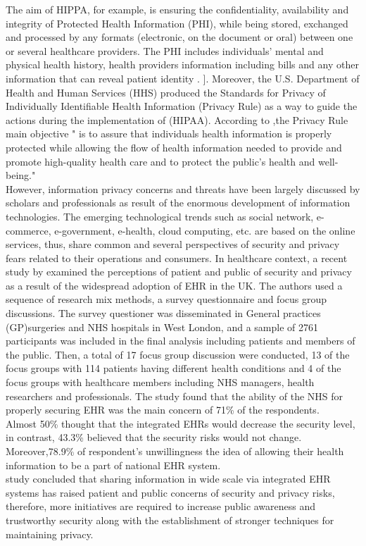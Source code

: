 The aim of HIPPA, for example, is ensuring the confidentiality, availability and integrity of Protected Health Information (PHI), while being stored, exchanged and processed by any formats (electronic, on the document or oral) between one or several healthcare providers. The PHI includes individuals’ mental and physical health history, health providers information including bills and any other information that can reveal patient identity  \cite{U.S.DepartmentofHealthandHumanServices,Rahim2016,Andriole2014a}.
]. Moreover, the U.S. Department of Health and Human Services (HHS) produced the Standards for Privacy of Individually Identifiable Health Information (Privacy Rule) as a way to guide the actions during the implementation of (HIPAA). According to  \cite{U.S.DepartmentofHealthandHumanServices},the Privacy Rule main objective " is to assure that individuals health information is properly protected while allowing the flow of health information needed to provide and promote high-quality health care and to protect the public's health and well-being."
\\
However, information privacy concerns and threats have been largely discussed by scholars and professionals as result of the enormous development of information technologies. The emerging technological trends such as social network, e-commerce, e-government, e-health, cloud computing, etc. are based on the online services, thus, share common and several perspectives of security and privacy fears related to their operations and consumers. In healthcare context, a recent study by  \citet{Papoutsi2015} examined the perceptions of patient and public of security and privacy as a result of the widespread adoption of EHR in the UK. The authors used a sequence of research mix methods, a survey questionnaire and focus group discussions. The survey questioner was disseminated in General practices (GP)surgeries and NHS hospitals in West London, and a sample of 2761 participants was included in the final analysis including patients and members of the public. Then, a total of 17 focus group discussion were conducted, 13 of the focus groups with 114 patients having different health conditions and 4 of the focus groups with healthcare members including NHS managers, health researchers and professionals. The study found that the ability of the NHS for properly securing EHR was the main concern of 71\% of the respondents. \\
Almost 50\% thought that the integrated EHRs would decrease the security level, in contrast, 43.3\% believed that the security risks would not change. Moreover,78.9\% of respondent’s unwillingness the idea of allowing their health information to be a part of national EHR system.\\
\citet{Papoutsi2015}study concluded that sharing information in wide scale via integrated EHR systems has raised patient and public concerns of security and privacy risks, therefore, more initiatives are required to increase public awareness and trustworthy security along with the establishment of stronger techniques for maintaining privacy.

